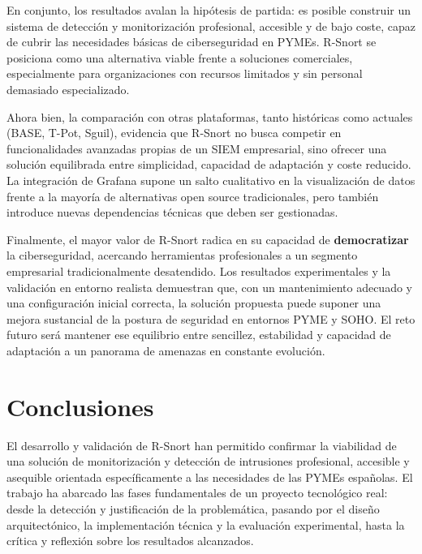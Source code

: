 \documentclass[11pt,a4paper,twoside]{report}
\begin{document}
En conjunto, los resultados avalan la hipótesis de partida: es posible construir un sistema de detección y monitorización profesional, accesible y de bajo coste, capaz de cubrir las necesidades básicas de ciberseguridad en PYMEs. R-Snort se posiciona como una alternativa viable frente a soluciones comerciales, especialmente para organizaciones con recursos limitados y sin personal demasiado especializado.\newline

Ahora bien, la comparación con otras plataformas, tanto históricas como actuales (BASE, T-Pot, Sguil), evidencia que R-Snort no busca competir en funcionalidades avanzadas propias de un SIEM empresarial, sino ofrecer una solución equilibrada entre simplicidad, capacidad de adaptación y coste reducido. La integración de Grafana supone un salto cualitativo en la visualización de datos frente a la mayoría de alternativas open source tradicionales, pero también introduce nuevas dependencias técnicas que deben ser gestionadas.\newline

Finalmente, el mayor valor de R-Snort radica en su capacidad de \textbf{democratizar} la ciberseguridad, acercando herramientas profesionales a un segmento empresarial tradicionalmente desatendido. Los resultados experimentales y la validación en entorno realista demuestran que, con un mantenimiento adecuado y una configuración inicial correcta, la solución propuesta puede suponer una mejora sustancial de la postura de seguridad en entornos PYME y SOHO. El reto futuro será mantener ese equilibrio entre sencillez, estabilidad y capacidad de adaptación a un panorama de amenazas en constante evolución.


\clearpage
\null
\thispagestyle{empty}
\newpage
\thispagestyle{empty}
\chapter*{Conclusiones}

El desarrollo y validación de R-Snort han permitido confirmar la viabilidad de una solución de monitorización y detección de intrusiones profesional, accesible y asequible orientada específicamente a las necesidades de las PYMEs españolas. El trabajo ha abarcado las fases fundamentales de un proyecto tecnológico real: desde la detección y justificación de la problemática, pasando por el diseño arquitectónico, la implementación técnica y la evaluación experimental, hasta la crítica y reflexión sobre los resultados alcanzados.\newline
\end{document}
